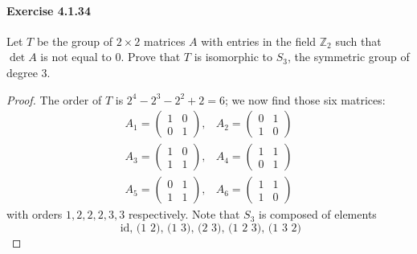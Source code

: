 \documentclass{article}
\begin{document}
\paragraph{Exercise 4.1.34} Let $T$ be the group of $2\times 2$ matrices $A$ with entries in the field $\mathbb{Z}_2$ such that $\det A$ is not equal to 0. Prove that $T$ is isomorphic to $S_3$, the symmetric group of degree 3.
\begin{proof}
    The order of $T$ is $2^4-2^3-2^2+2=6$; we now find those six matrices:
$$
\begin{array}{ll}
A_1=\left(\begin{array}{ll}
1 & 0 \\
0 & 1
\end{array}\right), & A_2=\left(\begin{array}{ll}
0 & 1 \\
1 & 0
\end{array}\right) \\
A_3=\left(\begin{array}{ll}
1 & 0 \\
1 & 1
\end{array}\right), & A_4=\left(\begin{array}{ll}
1 & 1 \\
0 & 1
\end{array}\right) \\
A_5=\left(\begin{array}{ll}
0 & 1 \\
1 & 1
\end{array}\right), & A_6=\left(\begin{array}{ll}
1 & 1 \\
1 & 0
\end{array}\right)
\end{array}
$$
with orders $1,2,2,2,3,3$ respectively.
Note that $S_3$ is composed of elements
$$
\text{ id, (1 2), (1 3), (2 3), (1 2 3), (1 3 2)} 
$$

\end{proof}
\end{document}
